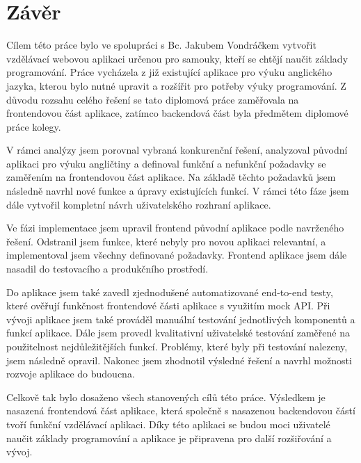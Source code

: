 \chapter*{Závěr}

Cílem této práce bylo ve spolupráci s Bc. Jakubem Vondráčkem vytvořit vzdělávací webovou aplikaci určenou pro samouky, kteří se chtějí naučit základy programování. Práce vycházela z již existující aplikace pro výuku anglického jazyka, kterou bylo nutné upravit a rozšířit pro potřeby výuky programování. Z důvodu rozsahu celého řešení se tato diplomová práce zaměřovala na frontendovou část aplikace, zatímco backendová část byla předmětem diplomové práce kolegy.

V rámci analýzy jsem porovnal vybraná konkurenční řešení, analyzoval původní aplikaci pro výuku angličtiny a definoval funkční a nefunkční požadavky se zaměřením na frontendovou část aplikace. Na základě těchto požadavků jsem následně navrhl nové funkce a úpravy existujících funkcí. V rámci této fáze jsem dále vytvořil kompletní návrh uživatelského rozhraní aplikace.

Ve fázi implementace jsem upravil frontend původní aplikace podle navrženého řešení. Odstranil jsem funkce, které nebyly pro novou aplikaci relevantní, a implementoval jsem všechny definované požadavky. Frontend aplikace jsem dále nasadil do testovacího a produkčního prostředí.

Do aplikace jsem také zavedl zjednodušené automatizované end-to-end testy, které ověřují funkčnost frontendové části aplikace s využitím mock API. Při vývoji aplikace jsem také prováděl manuální testování jednotlivých komponentů a funkcí aplikace. Dále jsem provedl kvalitativní uživatelské testování zaměřené na použitelnost nejdůležitějších funkcí. Problémy, které byly při testování nalezeny, jsem následně opravil. Nakonec jsem zhodnotil výsledné řešení a navrhl možnosti rozvoje aplikace do budoucna.

Celkově tak bylo dosaženo všech stanovených cílů této práce. Výsledkem je nasazená frontendová část aplikace, která společně s nasazenou backendovou částí tvoří funkční vzdělávací aplikaci. Díky této aplikaci se budou moci uživatelé naučit základy programování a aplikace je připravena pro další rozšiřování a vývoj.

